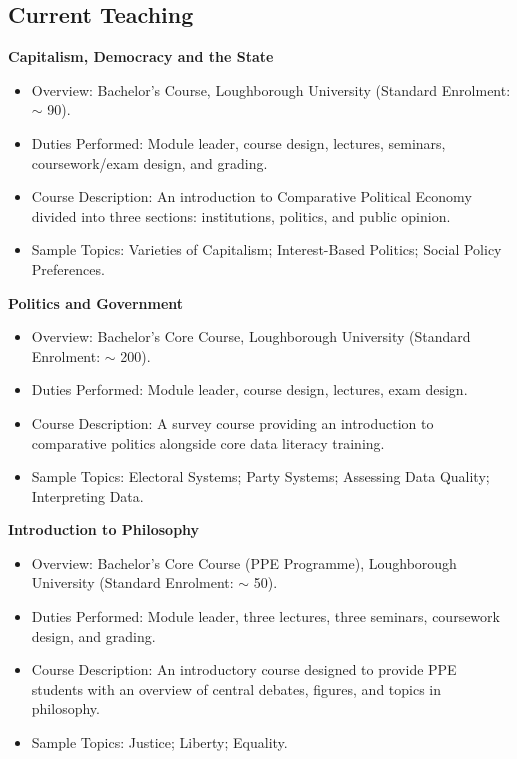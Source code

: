 \documentclass[11pt]{article}
\begin{document}
\subsection{Current Teaching}
\textbf{Capitalism, Democracy and the State}
	      \begin{itemize}[itemsep=0em, topsep=0em, partopsep=0em]
	      	\kern-\parskip\item Overview: Bachelor’s Course, Loughborough University (Standard Enrolment: $\sim$ 90).
	      	\item Duties Performed: Module leader, course design, lectures, seminars, coursework/exam design, and grading.
	      	\item Course Description: An introduction to Comparative Political Economy divided into three sections: institutions, politics, and public opinion. 
	      	\item Sample Topics: Varieties of Capitalism; Interest-Based Politics; Social Policy Preferences.
	      \end{itemize}
		\textbf{Politics and Government}
	      \begin{itemize}[itemsep=0em, topsep=0em, partopsep=0em]
	      	\kern-\parskip\item Overview: Bachelor’s Core Course, Loughborough University (Standard Enrolment: $\sim$ 200).
	      	\item Duties Performed: Module leader, course design, lectures, exam design.
	      	\item Course Description: A survey course providing an introduction to comparative politics alongside core data literacy training. 
	      	\item Sample Topics: Electoral Systems; Party Systems; Assessing Data Quality; Interpreting Data.
	      \end{itemize}
	\textbf{Introduction to Philosophy}
	      \begin{itemize}[itemsep=0em, topsep=0em, partopsep=0em]
	      	\kern-\parskip\item Overview: Bachelor’s Core Course (PPE Programme), Loughborough University (Standard Enrolment: $\sim$ 50).
	      	\item Duties Performed: Module leader, three lectures, three seminars, coursework design, and grading.
	      	\item Course Description: An introductory course designed to provide PPE students with an overview of central debates, figures, and topics in philosophy. 
	      	\item Sample Topics: Justice; Liberty; Equality.
	      \end{itemize}
\end{document}

